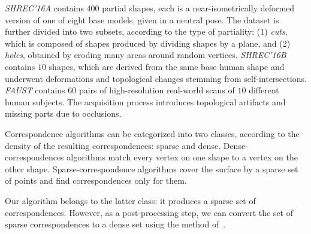 {\em SHREC'16A} contains $400$ partial shapes, each is a near-isometrically deformed version of one of eight base models, given in a neutral pose.
The dataset is further divided into two subsets, according to the type of partiality:
(1) \textit{cuts}, which is composed of shapes produced by dividing shapes by a plane, and (2) \textit{holes}, obtained by eroding many areas around random vertices.
{\em SHREC'16B} contains $10$ shapes, which are derived from the same base human shape and underwent deformations and topological changes stemming from self-intersections.
{\em FAUST} contains $60$ pairs of high-resolution real-world scans of $10$ different human subjects. 
The acquisition process introduces topological artifacts and missing parts due to occlusions. 

Correspondence algorithms can be categorized into two classes, according to the density of the resulting correspondences: sparse and dense.
Dense-correspondences algorithms match every vertex on one shape to a vertex on the other shape.
Sparse-correspondence algorithms cover the surface by a sparse set of points and find correspondences only for them.

Our algorithm belongs to the latter class: it produces a sparse set of correspondences.
However, as a post-processing step, we can convert the set of sparse correspondences to a dense set using the method of~\cite{litany2017fully}.


